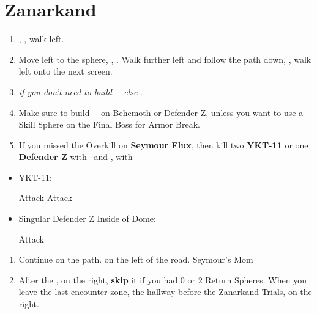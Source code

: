 \chapter{Zanarkand}
\begin{enumerate}
	\item \sd, \cs[0:50], walk left. \fmv+\cs[2:20]
	\item Move left to the sphere, \sd, \cs[1:40]. Walk further left and follow the path down, \cs[3:20], walk left onto the next screen.
	\item \formation{\tidus}{\auron}{\kimahri} \textit{if you don't need to build \rikku\ \od\ else} \formation{\tidus}{\auron}{\rikku}.
	\item Make sure to build \rikku\ \od\ on Behemoth or Defender Z, unless you want to use a Skill Sphere on the Final Boss for Armor Break.
	\item If you missed the Overkill on \textbf{Seymour Flux}, then kill two \textbf{YKT-11} or one \textbf{Defender Z} with \yuna\ and \tidus, with \formation{\tidus}{\yuna}{\auron}
\end{enumerate}
\begin{encounters}
	\begin{itemize}
		\item YKT-11:
		      \begin{itemize}
			      \tidusf Attack
			      \yunaf Attack
		      \end{itemize}
		\item Singular Defender Z Inside of Dome:
		      \begin{itemize}
			      \summon{\bahamut}
			      \bahamutf Attack
		      \end{itemize}
	\end{itemize}
\end{encounters}
\begin{enumerate}[resume]
	\item Continue on the path.  on the left of the road. Seymour's Mom \cs
	\item After the \cs,  on the right, \textbf{skip} it if you had 0 or 2 Return Spheres. When you leave the last encounter zone, the hallway before the Zanarkand Trials,  on the right.
\end{enumerate}
\vfill
